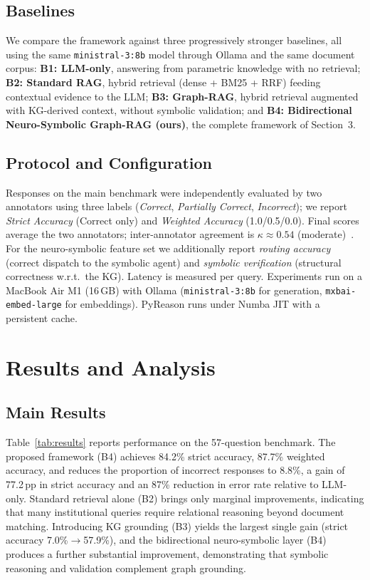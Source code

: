 \documentclass[runningheads]{llncs}
\begin{document}
\subsection{Baselines}

We compare the framework against three progressively stronger baselines, all using the same \texttt{ministral-3:8b} model through Ollama and the same document corpus:
\textbf{B1: LLM-only}, answering from parametric knowledge with no retrieval; \textbf{B2: Standard RAG}, hybrid retrieval (dense + BM25 + RRF) feeding contextual evidence to the LLM; \textbf{B3: Graph-RAG}, hybrid retrieval augmented with KG-derived context, without symbolic validation; and \textbf{B4: Bidirectional Neuro-Symbolic Graph-RAG (ours)}, the complete framework of Section~3.

\subsection{Protocol and Configuration}

Responses on the main benchmark were independently evaluated by two annotators using three labels (\textit{Correct}, \textit{Partially Correct}, \textit{Incorrect}); we report \textit{Strict Accuracy} (Correct only) and \textit{Weighted Accuracy} (1.0/0.5/0.0). Final scores average the two annotators; inter-annotator agreement is $\kappa\approx 0.54$ (moderate)~\cite{cohen1960}. For the neuro-symbolic feature set we additionally report \emph{routing accuracy} (correct dispatch to the symbolic agent) and \emph{symbolic verification} (structural correctness w.r.t.\ the KG). Latency is measured per query. Experiments run on a MacBook Air M1 (16\,GB) with Ollama (\texttt{ministral-3:8b} for generation, \texttt{mxbai-embed-large} for embeddings). PyReason runs under Numba JIT with a persistent cache.


\section{Results and Analysis}

\subsection{Main Results}

Table~\ref{tab:results} reports performance on the 57-question benchmark. The proposed framework (B4) achieves 84.2\% strict accuracy, 87.7\% weighted accuracy, and reduces the proportion of incorrect responses to 8.8\%, a gain of 77.2\,pp in strict accuracy and an 87\% reduction in error rate relative to LLM-only. Standard retrieval alone (B2) brings only marginal improvements, indicating that many institutional queries require relational reasoning beyond document matching. Introducing KG grounding (B3) yields the largest single gain (strict accuracy 7.0\%$\rightarrow$57.9\%), and the bidirectional neuro-symbolic layer (B4) produces a further substantial improvement, demonstrating that symbolic reasoning and validation complement graph grounding.
\end{document}
